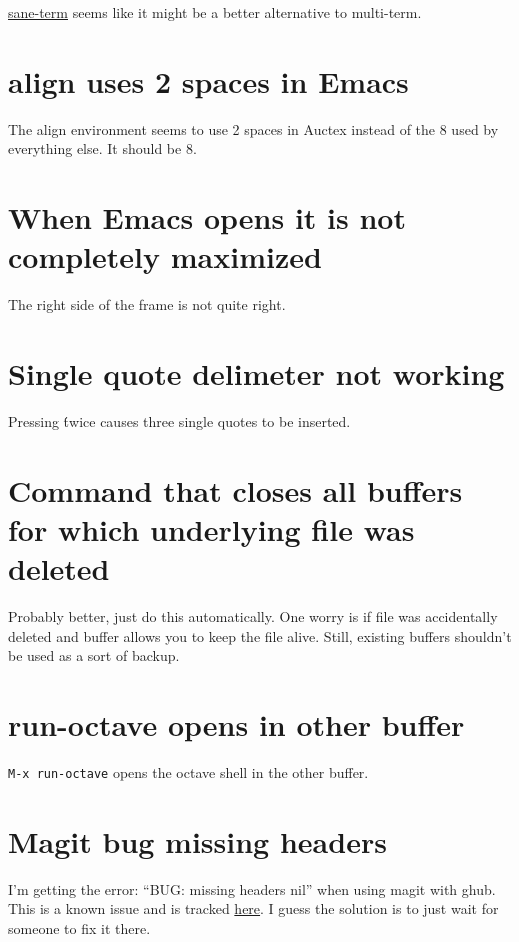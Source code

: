 \documentclass{default}
\begin{document}
\href{https://github.com/adamrt/sane-term}{sane-term} seems like it might be a better alternative to multi-term.

\section{align uses 2 spaces in Emacs}

The align environment seems to use 2 spaces in Auctex instead of the 8 used by everything else. It
should be 8.

\section{When Emacs opens it is not completely maximized}

The right side of the frame is not quite right.

\section{Single quote delimeter not working}

Pressing \' twice causes three single quotes to be inserted.

\section{Command that closes all buffers for which underlying file was deleted}

Probably better, just do this automatically. One worry is if file was accidentally deleted and
buffer allows you to keep the file alive. Still, existing buffers shouldn't be used as a sort of
backup.

\section{run-octave opens in other buffer}

\texttt{M-x run-octave} opens the octave shell in the other buffer.

\section{Magit bug missing headers}

I'm getting the error: ``BUG: missing headers nil'' when using magit with ghub. This is a known
issue and is tracked \href{https://github.com/magit/ghub/issues/81}{here}. I guess the solution is
to just wait for someone to fix it there.
\end{document}
